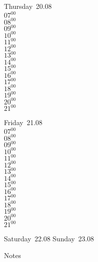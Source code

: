 \documentclass[11pt,a4paper]{book}\usepackage[]{graphicx}\usepackage[]{color}
\begin{document}
\clearpage
\begin{headerbox}
\end{headerbox}
\begin{weekdaybox}
  Thursday~20.08\\
  { 
  \vfill
  $07^{00}$\\
$08^{00}$\\
$09^{00}$\\
$10^{00}$\\
$11^{00}$\\
$12^{00}$\\
$13^{00}$\\
$14^{00}$\\
$15^{00}$\\
$16^{00}$\\
$17^{00}$\\
$18^{00}$\\
$19^{00}$\\
$20^{00}$\\
$21^{00}$\\
  }
\end{weekdaybox} 
\begin{weekdaybox}
  Friday~21.08\\
  { 
  \vfill
  $07^{00}$\\
$08^{00}$\\
$09^{00}$\\
$10^{00}$\\
$11^{00}$\\
$12^{00}$\\
$13^{00}$\\
$14^{00}$\\
$15^{00}$\\
$16^{00}$\\
$17^{00}$\\
$18^{00}$\\
$19^{00}$\\
$20^{00}$\\
$21^{00}$\\
  }
\end{weekdaybox}
\begin{weekendbox}
  Saturday~22.08
  \tcblower
  Sunday~23.08
\end{weekendbox} %
\begin{notebox}
  Notes
\end{notebox}
\clearpage
\end{document}
